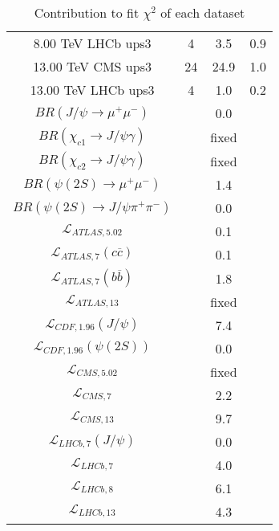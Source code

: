 \begin{table}[h!]
\begin{tabular}{c|c|c|c}
8.00 TeV LHCb ups3 & 4 & 3.5 & 0.9 \\
13.00 TeV CMS ups3 & 24 & 24.9 & 1.0 \\
13.00 TeV LHCb ups3 & 4 & 1.0 & 0.2 \\
\hline
$BR(J/\psi\rightarrow\mu^+\mu^-)$ &  & 0.0 &  \\
$BR(\chi_{c1}\rightarrow J/\psi\gamma)$ &  & fixed & \\
$BR(\chi_{c2}\rightarrow J/\psi\gamma)$ &  & fixed & \\
$BR(\psi(2S)\rightarrow\mu^+\mu^-)$ &  & 1.4 &  \\
$BR(\psi(2S)\rightarrow J/\psi\pi^+\pi^-)$ &  & 0.0 &  \\
$\mathcal L_{ATLAS,5.02}$ &  & 0.1 &  \\
$\mathcal L_{ATLAS,7}(c\overline c)$ &  & 0.1 &  \\
$\mathcal L_{ATLAS,7}(b\overline b)$ &  & 1.8 &  \\
$\mathcal L_{ATLAS,13}$ &  & fixed & \\
$\mathcal L_{CDF,1.96}(J/\psi)$ &  & 7.4 &  \\
$\mathcal L_{CDF,1.96}(\psi(2S))$ &  & 0.0 &  \\
$\mathcal L_{CMS,5.02}$ &  & fixed & \\
$\mathcal L_{CMS,7}$ &  & 2.2 &  \\
$\mathcal L_{CMS,13}$ &  & 9.7 &  \\
$\mathcal L_{LHCb,7}(J/\psi)$ &  & 0.0 &  \\
$\mathcal L_{LHCb,7}$ &  & 4.0 &  \\
$\mathcal L_{LHCb,8}$ &  & 6.1 &  \\
$\mathcal L_{LHCb,13}$ &  & 4.3 &  \\
\end{tabular}
\caption{Contribution to fit $\chi^2$ of each dataset}
\end{table}
